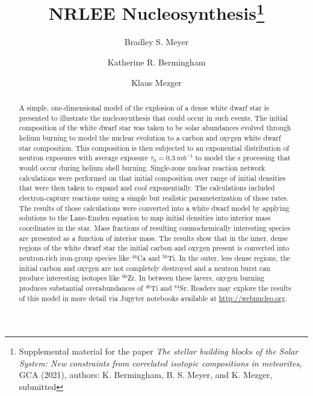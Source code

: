 \documentclass[preprint]{revtex4-2}
\begin{document}
\title{NRLEE Nucleosynthesis\footnote{Supplemental material for the paper
{\it The stellar building blocks of the Solar System: New constraints from correlated isotopic compositions in meteorites}, GCA (2021), authors: K. Bermingham,
B. S. Meyer, and K. Mezger, submitted}}
\author{Bradley S. Meyer}
\author{Katherine R. Bermingham}
\author{Klaus Mezger}

\begin{abstract}
A simple, one-dimensional model of the explosion of a dense white dwarf star
is presented to illustrate the nucleosynthesis that could occur in
such events.
The initial composition of the white dwarf star
was taken to be solar abundances evolved through helium burning to model
the nuclear evolution to a carbon and oxygen white dwarf star composition.
This composition is then
subjected to an exponential distribution of neutron exposures with average
exposure $\tau_0 = 0.3\ mb^{-1}$ to model the s processing that would occur
during helium shell burning.
Single-zone nuclear reaction network calculations
were performed on that initial composition over
range of initial densities that were then taken to expand
and cool exponentially.  The calculations included electron-capture reactions
using a simple but realistic parameterization of those rates.  The results
of those calculations were converted into a white dwarf model by applying
solutions to the Lane-Emden equation to map initial densities into interior
mass coordinates in the star.  Mass fractions of resulting
cosmochemically interesting species are presented as a function of interior
mass.  The results show that in the inner, dense regions of the white dwarf star
the initial carbon and oxygen present is converted into neutron-rich iron-group
species like $^{48}$Ca and $^{50}$Ti.  In the outer, less dense regions,
the initial carbon and oxygen are not completely destroyed and a neutron burst
can produce interesting isotopes like $^{96}$Zr.  In between these layers,
oxygen burning produces substantial overabundances of $^{46}$Ti and $^{84}$Sr.
Readers may explore the results of this model in more detail via Jupyter
notebooks available at \url{http://webnucleo.org}.
\end{abstract}

\maketitle
\end{document}
